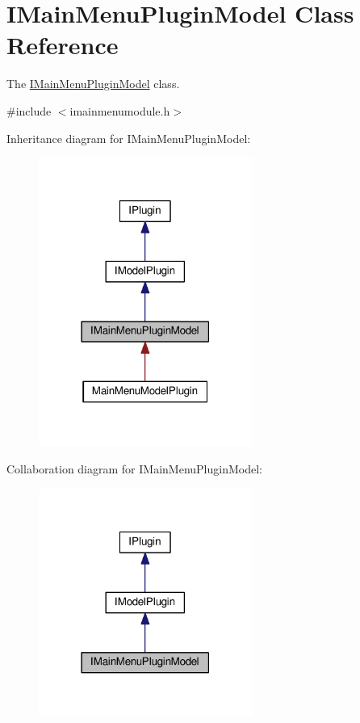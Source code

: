 \hypertarget{class_i_main_menu_plugin_model}{}\section{I\+Main\+Menu\+Plugin\+Model Class Reference}
\label{class_i_main_menu_plugin_model}


The \hyperlink{class_i_main_menu_plugin_model}{I\+Main\+Menu\+Plugin\+Model} class.  




{\ttfamily \#include $<$imainmenumodule.\+h$>$}



Inheritance diagram for I\+Main\+Menu\+Plugin\+Model\+:\nopagebreak
\begin{figure}[H]
\begin{center}
\leavevmode
\includegraphics[width=198pt]{class_i_main_menu_plugin_model__inherit__graph}
\end{center}
\end{figure}


Collaboration diagram for I\+Main\+Menu\+Plugin\+Model\+:\nopagebreak
\begin{figure}[H]
\begin{center}
\leavevmode
\includegraphics[width=198pt]{class_i_main_menu_plugin_model__coll__graph}
\end{center}
\end{figure}
